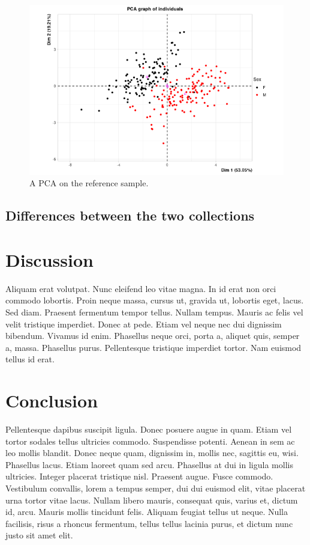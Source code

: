 \documentclass{elsarticle}
\begin{document}
\begin{figure}[htbp]
\centering
\includegraphics[width=.9\linewidth]{PCA.png}
\caption{A PCA on the reference sample. \label{fig-pca}}
\end{figure}

\subsection{Differences between the two collections}
\label{sec:orge8b2a2f}

\section{Discussion}
\label{sec:org2a9b1e2}
Aliquam erat volutpat.  Nunc eleifend leo vitae magna.  In id erat non orci commodo lobortis.  Proin neque massa, cursus ut, gravida ut, lobortis eget, lacus.  Sed diam.  Praesent fermentum tempor tellus.  Nullam tempus.  Mauris ac felis vel velit tristique imperdiet.  Donec at pede.  Etiam vel neque nec dui dignissim bibendum.  Vivamus id enim.  Phasellus neque orci, porta a, aliquet quis, semper a, massa.  Phasellus purus.  Pellentesque tristique imperdiet tortor.  Nam euismod tellus id erat.

\section{Conclusion}
\label{sec:org509faad}
Pellentesque dapibus suscipit ligula.  Donec posuere augue in quam.  Etiam vel tortor sodales tellus ultricies commodo.  Suspendisse potenti.  Aenean in sem ac leo mollis blandit.  Donec neque quam, dignissim in, mollis nec, sagittis eu, wisi.  Phasellus lacus.  Etiam laoreet quam sed arcu.  Phasellus at dui in ligula mollis ultricies.  Integer placerat tristique nisl.  Praesent augue.  Fusce commodo.  Vestibulum convallis, lorem a tempus semper, dui dui euismod elit, vitae placerat urna tortor vitae lacus.  Nullam libero mauris, consequat quis, varius et, dictum id, arcu.  Mauris mollis tincidunt felis.  Aliquam feugiat tellus ut neque.  Nulla facilisis, risus a rhoncus fermentum, tellus tellus lacinia purus, et dictum nunc justo sit amet elit.


\end{document}
